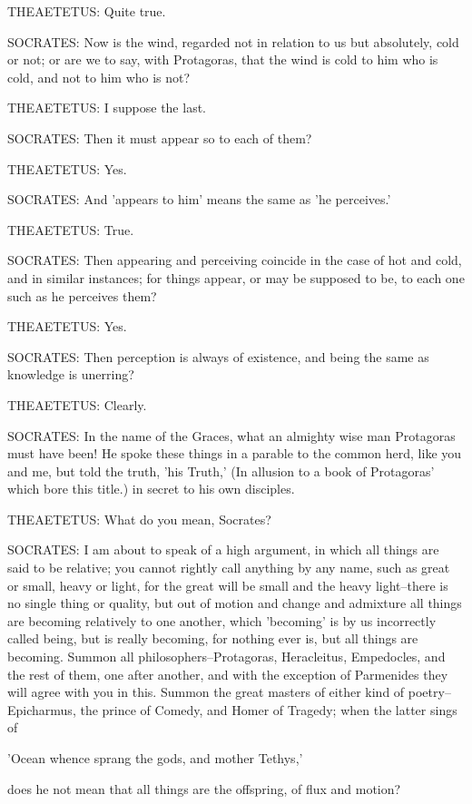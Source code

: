THEAETETUS: Quite true.

SOCRATES: Now is the wind, regarded not in relation to us but
absolutely, cold or not; or are we to say, with Protagoras, that the
wind is cold to him who is cold, and not to him who is not?

THEAETETUS: I suppose the last.

SOCRATES: Then it must appear so to each of them?

THEAETETUS: Yes.

SOCRATES: And 'appears to him' means the same as 'he perceives.'

THEAETETUS: True.

SOCRATES: Then appearing and perceiving coincide in the case of hot and
cold, and in similar instances; for things appear, or may be supposed to
be, to each one such as he perceives them?

THEAETETUS: Yes.

SOCRATES: Then perception is always of existence, and being the same as
knowledge is unerring?

THEAETETUS: Clearly.

SOCRATES: In the name of the Graces, what an almighty wise man
Protagoras must have been! He spoke these things in a parable to the
common herd, like you and me, but told the truth, 'his Truth,' (In
allusion to a book of Protagoras' which bore this title.) in secret to
his own disciples.

THEAETETUS: What do you mean, Socrates?

SOCRATES: I am about to speak of a high argument, in which all things
are said to be relative; you cannot rightly call anything by any name,
such as great or small, heavy or light, for the great will be small and
the heavy light--there is no single thing or quality, but out of motion
and change and admixture all things are becoming relatively to one
another, which 'becoming' is by us incorrectly called being, but is
really becoming, for nothing ever is, but all things are becoming.
Summon all philosophers--Protagoras, Heracleitus, Empedocles, and the
rest of them, one after another, and with the exception of Parmenides
they will agree with you in this. Summon the great masters of either
kind of poetry--Epicharmus, the prince of Comedy, and Homer of Tragedy;
when the latter sings of

'Ocean whence sprang the gods, and mother Tethys,'

does he not mean that all things are the offspring, of flux and motion?

